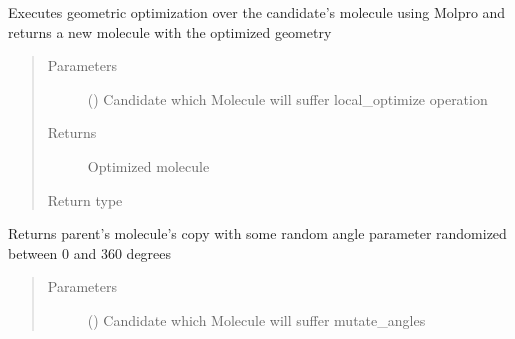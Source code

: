 \documentclass[letterpaper,10pt,english]{sphinxmanual}
\begin{document}
\begin{fulllineitems}
\begin{fulllineitems}
\label{\detokenize{MolOpt:MolOpt.MolOpt.local_optimize}}
\sphinxAtStartPar
Executes geometric optimization over the candidate’s molecule using Molpro and returns a new molecule with
the optimized geometry
\begin{quote}\begin{description}
\item[{Parameters}] \leavevmode
\sphinxAtStartPar
{} ({\hyperref[\detokenize{genetic:genetic.Chromosome}]{}}) \textendash{} Candidate which Molecule will suffer local\_optimize operation

\item[{Returns}] \leavevmode
\sphinxAtStartPar
Optimized molecule

\item[{Return type}] \leavevmode
\sphinxAtStartPar
{\hyperref[\detokenize{molecular:molecular.Molecule}]{}}

\end{description}\end{quote}

\end{fulllineitems}


\begin{fulllineitems}
\label{\detokenize{MolOpt:MolOpt.MolOpt.mutate_angles}}
\sphinxAtStartPar
Returns parent’s molecule’s copy with some random angle parameter randomized between 0 and 360 degrees
\begin{quote}\begin{description}
\item[{Parameters}] \leavevmode
\sphinxAtStartPar
{} ({\hyperref[\detokenize{genetic:genetic.Chromosome}]{}}) \textendash{} Candidate which Molecule will suffer mutate\_angles


\end{description}
\end{quote}
\end{fulllineitems}
\end{fulllineitems}
\end{document}
